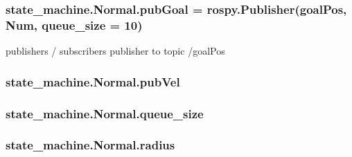 \subsubsection[{\texorpdfstring{pub\+Goal}{pubGoal}}]{\setlength{\rightskip}{0pt plus 5cm}state\+\_\+machine.\+Normal.\+pub\+Goal = rospy.\+Publisher(\textquotesingle{}goal\+Pos\textquotesingle{}, Num, {\bf queue\+\_\+size} = 10)\hspace{0.3cm}{\ttfamily [static]}}\hypertarget{classstate__machine_1_1Normal_abf3086095a488112b289e23941a57809}{}\label{classstate__machine_1_1Normal_abf3086095a488112b289e23941a57809}


publishers / subscribers publisher to topic /goal\+Pos 

\subsubsection[{\texorpdfstring{pub\+Vel}{pubVel}}]{\setlength{\rightskip}{0pt plus 5cm}state\+\_\+machine.\+Normal.\+pub\+Vel\hspace{0.3cm}{\ttfamily [static]}}\hypertarget{classstate__machine_1_1Normal_a8f98c449693c58319157bc51e2621157}{}\label{classstate__machine_1_1Normal_a8f98c449693c58319157bc51e2621157}
\subsubsection[{\texorpdfstring{queue\+\_\+size}{queue_size}}]{\setlength{\rightskip}{0pt plus 5cm}state\+\_\+machine.\+Normal.\+queue\+\_\+size\hspace{0.3cm}{\ttfamily [static]}}\hypertarget{classstate__machine_1_1Normal_ae4b7ade70a0e23f0dd8738aaca0b4e4d}{}\label{classstate__machine_1_1Normal_ae4b7ade70a0e23f0dd8738aaca0b4e4d}
\subsubsection[{\texorpdfstring{radius}{radius}}]{\setlength{\rightskip}{0pt plus 5cm}state\+\_\+machine.\+Normal.\+radius\hspace{0.3cm}{\ttfamily [static]}}\hypertarget{classstate__machine_1_1Normal_afa87ced0c5fa2d65c957a16bd517fc39}{}\label{classstate__machine_1_1Normal_afa87ced0c5fa2d65c957a16bd517fc39}
